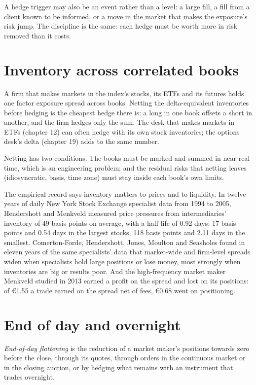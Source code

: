 A hedge trigger may also be an event rather than a level: a large fill, a fill from a client known to be informed, or a move in the market that
makes the exposure's risk jump. The discipline is the same: each hedge must be worth more in risk removed than it costs.

\section{Inventory across correlated books}

A firm that makes markets in the index's stocks, its ETFs and its futures holds one factor exposure spread across books. Netting the
delta-equivalent inventories before hedging is the cheapest hedge there is: a long in one book offsets a short in another, and the firm hedges only
the sum. The desk that makes markets in ETFs (chapter 12) can often hedge with its own stock inventories; the options desk's delta (chapter 19) adds
to the same number.

Netting has two conditions. The books must be marked and summed in near real time, which is an engineering problem; and the residual risks that
netting leaves (idiosyncratic, basis, time zone) must stay inside each book's own limits.

The empirical record says inventory matters to prices and to liquidity. In twelve years of daily New York Stock Exchange specialist data from 1994 to
2005, Hendershott and Menkveld measured price pressures from intermediaries' inventory of 49 basis points on average, with a half life of 0.92
days: 17 basis points and 0.54 days in the largest stocks, 118 basis points and 2.11 days in the smallest. Comerton-Forde, Hendershott, Jones,
Moulton and Seasholes found in eleven years of the same specialists' data that market-wide and firm-level spreads widen when specialists hold large
positions or lose money, most strongly when inventories are big or results poor. And the high-frequency market maker Menkveld studied in 2013 earned
a profit on the spread and lost on its positions: of \euro1.55 a trade earned on the spread net of fees, \euro0.68 went on positioning.

\section{End of day and overnight}

\begin{definition}\label{def:hf:hedging-and-inventory-in-practice:flatten}
\emph{End-of-day flattening} is the reduction of a market maker's positions towards zero before the close, through its
quotes, through orders in the continuous market or in the closing auction, or by hedging what remains with an instrument that trades overnight.
\end{definition}

